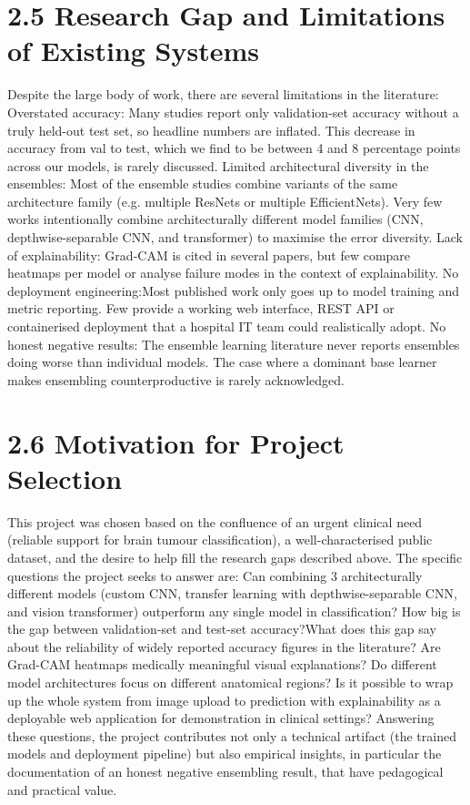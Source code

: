 \documentclass[12pt,a4paper,oneside]{report}
\begin{document}
\section{2.5 Research Gap and Limitations of Existing Systems}
Despite the large body of work, there are several limitations in the literature:
Overstated accuracy: Many studies report only validation-set accuracy without a truly held-out test set, so headline numbers are inflated. This decrease in accuracy from val to test, which we find to be between 4 and 8 percentage points across our models, is rarely discussed.
Limited architectural diversity in the ensembles: Most of the ensemble studies combine variants of the same architecture family (e.g. multiple ResNets or multiple EfficientNets). Very few works intentionally combine architecturally different model families (CNN, depthwise-separable CNN, and transformer) to maximise the error diversity.
Lack of explainability: Grad-CAM is cited in several papers, but few compare heatmaps per model or analyse failure modes in the context of explainability. 
No deployment engineering:Most published work only goes up to model training and metric reporting. Few provide a working web interface, REST API or containerised deployment that a hospital IT team could realistically adopt.
No honest negative results:  The ensemble learning literature never reports ensembles doing worse than individual models. The case where a dominant base learner makes ensembling counterproductive is rarely acknowledged.
\section{2.6 Motivation for Project Selection}
This project was chosen based on the confluence of an urgent clinical need (reliable support for brain tumour classification), a well-characterised public dataset, and the desire to help fill the research gaps described above. The specific questions the project seeks to answer are:
Can combining 3 architecturally different models (custom CNN, transfer learning with depthwise-separable CNN, and vision transformer) outperform any single model in classification?
How big is the gap between validation-set and test-set accuracy?What does this gap say about the reliability of widely reported accuracy figures in the literature?
Are Grad-CAM heatmaps medically meaningful visual explanations? Do different model architectures focus on different anatomical regions?
Is it possible to wrap up the whole system from image upload to prediction with explainability as a deployable web application for demonstration in clinical settings?
Answering these questions, the project contributes not only a technical artifact (the trained models and deployment pipeline) but also empirical insights, in particular the documentation of an honest negative ensembling result, that have pedagogical and practical value.
\end{document}
